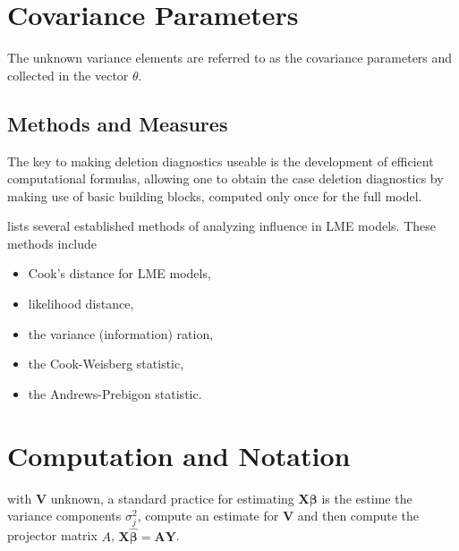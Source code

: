 \documentclass[12pt, a4paper]{report}
\theoremstyle{plain}
\theoremstyle{definition}
\theoremstyle{remark}
\begin{document}
\section{Covariance Parameters} %
The unknown variance elements are referred to as the covariance parameters and collected in the vector $\theta$.

\subsection{Methods and Measures}
The key to making deletion diagnostics useable is the development of efficient computational formulas, allowing one to obtain the  case deletion diagnostics by making use of basic building blocks, computed only once for the full model.

\citet{Zewotir} lists several established methods of analyzing influence in LME models. These methods include \begin{itemize}
	\item Cook's distance for LME models,
	\item {} likelihood distance,
	\item the variance (information) ration,
	\item the  Cook-Weisberg statistic,
	\item the  Andrews-Prebigon statistic.
\end{itemize}



\section{Computation and Notation } %
with $\boldsymbol{V}$ unknown, a standard practice for estimating $\boldsymbol{X \beta}$ is the estime the variance components $\sigma^2_j$,
compute an estimate for $\boldsymbol{V}$ and then compute the projector matrix $A$, $\boldsymbol{X \hat{\beta}}  = \boldsymbol{AY}$.
\end{document}
